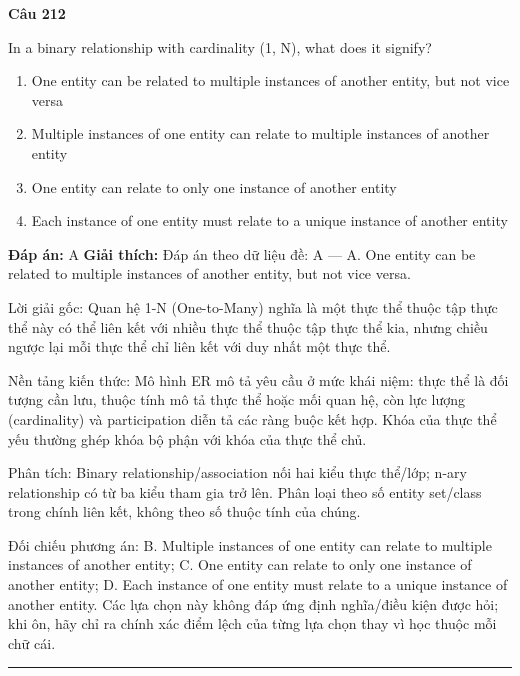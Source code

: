\documentclass[11pt,a4paper]{article}
\newenvironment{question}[1]{%
  \par\vspace{1em}\noindent\textbf{\large Câu #1}\par\vspace{0.4em}
}{%
  \par\vspace{1em}\hrule\vspace{0.6em}
}
\newenvironment{choices}{%
  \begin{enumerate}[label=\textbf{\Alph*.},leftmargin=2.2em,itemsep=2pt,topsep=3pt]
}{%
  \end{enumerate}
}
\newcommand{\choice}{\item}
\begin{document}
\begin{question}{212}
In a binary relationship with cardinality (1, N), what does it signify?
\begin{choices}
\choice One entity can be related to multiple instances of another entity, but not vice versa
\choice Multiple instances of one entity can relate to multiple instances of another entity
\choice One entity can relate to only one instance of another entity
\choice Each instance of one entity must relate to a unique instance of another entity
\end{choices}
\textbf{Đáp án:} A
\textbf{Giải thích:} Đáp án theo dữ liệu đề: A — A. One entity can be related to multiple instances of another entity, but not vice versa.

Lời giải gốc: Quan hệ 1-N (One-to-Many) nghĩa là một thực thể thuộc tập thực thể này có thể liên kết với nhiều thực thể thuộc tập thực thể kia, nhưng chiều ngược lại mỗi thực thể chỉ liên kết với duy nhất một thực thể.

Nền tảng kiến thức: Mô hình ER mô tả yêu cầu ở mức khái niệm: thực thể là đối tượng cần lưu, thuộc tính mô tả thực thể hoặc mối quan hệ, còn lực lượng (cardinality) và participation diễn tả các ràng buộc kết hợp. Khóa của thực thể yếu thường ghép khóa bộ phận với khóa của thực thể chủ.

Phân tích: Binary relationship/association nối hai kiểu thực thể/lớp; n-ary relationship có từ ba kiểu tham gia trở lên. Phân loại theo số entity set/class trong chính liên kết, không theo số thuộc tính của chúng.

Đối chiếu phương án: B. Multiple instances of one entity can relate to multiple instances of another entity; C. One entity can relate to only one instance of another entity; D. Each instance of one entity must relate to a unique instance of another entity. Các lựa chọn này không đáp ứng định nghĩa/điều kiện được hỏi; khi ôn, hãy chỉ ra chính xác điểm lệch của từng lựa chọn thay vì học thuộc mỗi chữ cái.
\end{question}
\end{document}
